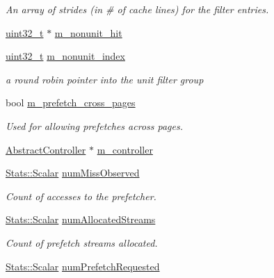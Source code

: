 \begin{DoxyCompactItemize}
\begin{DoxyCompactList}\small\item\em An array of strides (in \# of cache lines) for the filter entries. \item\end{DoxyCompactList}\item 
\hyperlink{Type_8hh_a435d1572bf3f880d55459d9805097f62}{uint32\_\-t} $\ast$ \hyperlink{classPrefetcher_ad152c2b22b30ca16bd8a4247fbf54e41}{m\_\-nonunit\_\-hit}
\item 
\hyperlink{Type_8hh_a435d1572bf3f880d55459d9805097f62}{uint32\_\-t} \hyperlink{classPrefetcher_abf85cabfde70657a26802059aeb4b971}{m\_\-nonunit\_\-index}
\begin{DoxyCompactList}\small\item\em a round robin pointer into the unit filter group \item\end{DoxyCompactList}\item 
bool \hyperlink{classPrefetcher_ac07a573d2ab82546c1d3291e9124db84}{m\_\-prefetch\_\-cross\_\-pages}
\begin{DoxyCompactList}\small\item\em Used for allowing prefetches across pages. \item\end{DoxyCompactList}\item 
\hyperlink{classAbstractController}{AbstractController} $\ast$ \hyperlink{classPrefetcher_a1e7049f2cd244dc3944af370eb3e979a}{m\_\-controller}
\item 
\hyperlink{classStats_1_1Scalar}{Stats::Scalar} \hyperlink{classPrefetcher_ad1e6c9fb59c342c342de2ec92e395174}{numMissObserved}
\begin{DoxyCompactList}\small\item\em Count of accesses to the prefetcher. \item\end{DoxyCompactList}\item 
\hyperlink{classStats_1_1Scalar}{Stats::Scalar} \hyperlink{classPrefetcher_a9fa8a2d34e0af70cb6db907ad8df7470}{numAllocatedStreams}
\begin{DoxyCompactList}\small\item\em Count of prefetch streams allocated. \item\end{DoxyCompactList}\item 
\hyperlink{classStats_1_1Scalar}{Stats::Scalar} \hyperlink{classPrefetcher_a112363546083c7fbefe26b74e3181baf}{numPrefetchRequested}

\end{DoxyCompactItemize}
